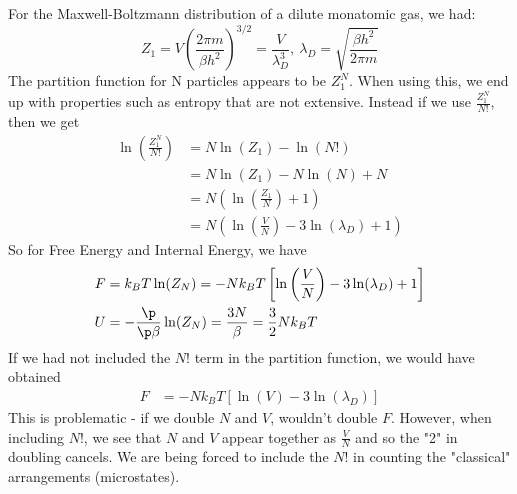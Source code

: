 \documentclass[a4paper, 11pt, normalem]{report}
\begin{document}
\chapter{}
For the Maxwell-Boltzmann distribution of a dilute monatomic gas, we had:
\begin{equation}
    Z_1 = V\left(\frac{2\pi m}{\beta h^2}\right)^{3/2}  = \frac{V}{\lambda_D^3},~ \lambda_D = \sqrt{\frac{\beta h^2}{2\pi m}}
\end{equation}
The partition function for N particles appears to be $Z_1^N$.
When using this, we end up with properties such as entropy that are not extensive. 
Instead if we use $\frac{Z_1^N}{N!}$, then we get
\begin{align}
    \ln\left(\frac{Z_1^N}{N!}\right) &= N\ln(Z_1) - \ln(N!) \\
                                     &= N\ln(Z_1) - N\ln(N) + N \\
                                     &= N\left(\ln\left(\frac{Z_1}{N}\right) + 1\right) \\
                                     &= N\left(\ln\left(\frac{V}{N}\right) - 3\ln(\lambda_D) + 1\right)
\end{align}
So for Free Energy and Internal Energy, we have
\begin{align}
    F &= k_BT\ln(Z_N) = -Nk_BT\left[\ln\left(\frac{V}{N}\right) - 3\ln(\lambda_D) + 1\right] \\
    U &= -\frac{\p}{\p\beta}\ln(Z_N) = \frac{3N}{\beta} = \frac{3}{2}Nk_BT
\end{align}
If we had not included the $N!$ term in the partition function, we would have obtained
\begin{align}
    F &= -Nk_BT\left[\ln(V) - 3\ln(\lambda_D)\right]
\end{align}
This is problematic - if we double $N$ and $V$, wouldn't double $F$. 
However, when including $N!$, we see that $N$ and $V$ appear together as $\frac{V}{N}$ and so the "2" in doubling cancels. 
We are being forced to include the $N!$ in counting the "classical" arrangements (microstates).
\end{document}
